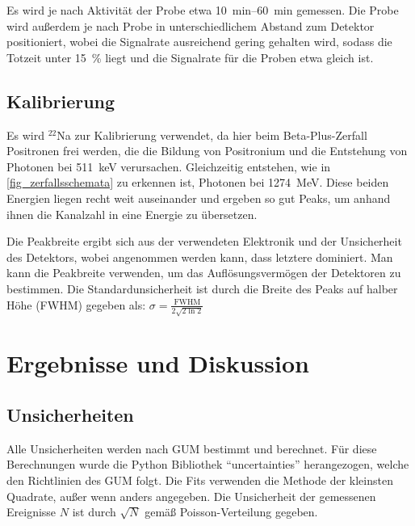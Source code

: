\documentclass[
	a4paper,
	12pt,
	pagesize,
	ngerman
]{scrartcl}
\begin{document}
	Es wird je nach Aktivität der Probe etwa \SIrange{10}{60}{\minute} gemessen.
	Die Probe wird außerdem je nach Probe in unterschiedlichem Abstand zum Detektor positioniert, wobei die Signalrate ausreichend gering gehalten wird, sodass die Totzeit unter \SI{15}{\percent} liegt und die Signalrate für die Proben etwa gleich ist.

	\subsection{Kalibrierung}

	Es wird $^{22}$Na zur Kalibrierung verwendet, da hier beim Beta-Plus-Zerfall Positronen frei werden, die die Bildung von Positronium und die Entstehung von Photonen bei \SI{511}{keV} verursachen.
	Gleichzeitig entstehen, wie in \cref{fig_zerfallsschemata} zu erkennen ist, Photonen bei \SI{1274}{MeV}.
	Diese beiden Energien liegen recht weit auseinander und ergeben so gut Peaks, um anhand ihnen die Kanalzahl in eine Energie zu übersetzen.

	Die Peakbreite ergibt sich aus der verwendeten Elektronik und der Unsicherheit des Detektors, wobei angenommen werden kann, dass letztere dominiert.
	Man kann die Peakbreite verwenden, um das Auflösungsvermögen der Detektoren zu bestimmen.
	Die Standardunsicherheit ist durch die Breite des Peaks auf halber Höhe (FWHM) gegeben als: $\sigma = \frac{\text{FWHM}}{2\sqrt{2 \ln 2}}$

	\section{Ergebnisse und Diskussion}



	\subsection{Unsicherheiten}
	Alle Unsicherheiten werden nach GUM bestimmt und berechnet.
	Für diese Berechnungen wurde die Python Bibliothek \enquote{uncertainties} herangezogen, welche den Richtlinien des GUM folgt.
	Die Fits verwenden die Methode der kleinsten Quadrate, außer wenn anders angegeben.
	Die Unsicherheit der gemessenen Ereignisse $N$ ist durch $\sqrt{N}$ gemäß Poisson-Verteilung gegeben.
\end{document}
